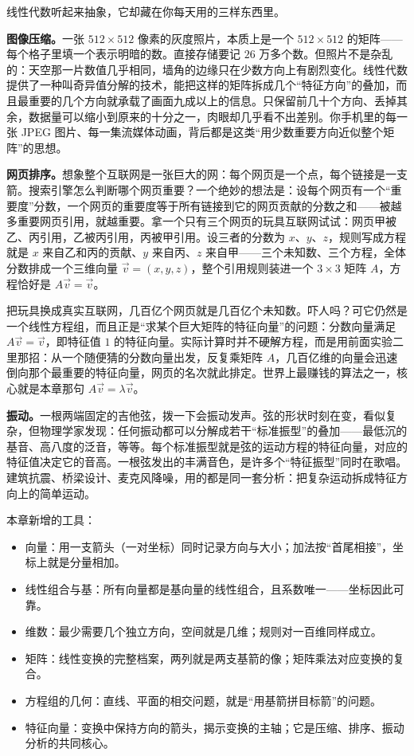 线性代数听起来抽象，它却藏在你每天用的三样东西里。

\textbf{图像压缩。}一张 $512\times512$ 像素的灰度照片，本质上是一个 $512\times512$ 的矩阵——每个格子里填一个表示明暗的数。直接存储要记 $26$ 万多个数。但照片不是杂乱的：天空那一片数值几乎相同，墙角的边缘只在少数方向上有剧烈变化。线性代数提供了一种叫奇异值分解的技术，能把这样的矩阵拆成几个“特征方向”的叠加，而且最重要的几个方向就承载了画面九成以上的信息。只保留前几十个方向、丢掉其余，数据量可以缩小到原来的十分之一，肉眼却几乎看不出差别。你手机里的每一张 JPEG 图片、每一集流媒体动画，背后都是这类“用少数重要方向近似整个矩阵”的思想。

\textbf{网页排序。}想象整个互联网是一张巨大的网：每个网页是一个点，每个链接是一支箭。搜索引擎怎么判断哪个网页重要？一个绝妙的想法是：设每个网页有一个“重要度”分数，一个网页的重要度等于所有链接到它的网页贡献的分数之和——被越多重要网页引用，就越重要。拿一个只有三个网页的玩具互联网试试：网页甲被乙、丙引用，乙被丙引用，丙被甲引用。设三者的分数为 $x$、$y$、$z$，规则写成方程就是 $x$ 来自乙和丙的贡献、$y$ 来自丙、$z$ 来自甲——三个未知数、三个方程，全体分数排成一个三维向量 $\vec{v}=(x,y,z)$，整个引用规则装进一个 $3\times3$ 矩阵 $A$，方程恰好是 $A\vec{v}=\vec{v}$。

把玩具换成真实互联网，几百亿个网页就是几百亿个未知数。吓人吗？可它仍然是一个线性方程组，而且正是“求某个巨大矩阵的特征向量”的问题：分数向量满足 $A\vec{v}=\vec{v}$，即特征值 $1$ 的特征向量。实际计算时并不硬解方程，而是用前面实验二里那招：从一个随便猜的分数向量出发，反复乘矩阵 $A$，几百亿维的向量会迅速倒向那个最重要的特征向量，网页的名次就此排定。世界上最赚钱的算法之一，核心就是本章那句 $A\vec{v}=\lambda\vec{v}$。

\textbf{振动。}一根两端固定的吉他弦，拨一下会振动发声。弦的形状时刻在变，看似复杂，但物理学家发现：任何振动都可以分解成若干“标准振型”的叠加——最低沉的基音、高八度的泛音，等等。每个标准振型就是弦的运动方程的特征向量，对应的特征值决定它的音高。一根弦发出的丰满音色，是许多个“特征振型”同时在歌唱。建筑抗震、桥梁设计、麦克风降噪，用的都是同一套分析：把复杂运动拆成特征方向上的简单运动。

\begin{toolbox}
本章新增的工具：
\begin{itemize}
\item 向量：用一支箭头（一对坐标）同时记录方向与大小；加法按“首尾相接”，坐标上就是分量相加。
\item 线性组合与基：所有向量都是基向量的线性组合，且系数唯一——坐标因此可靠。
\item 维数：最少需要几个独立方向，空间就是几维；规则对一百维同样成立。
\item 矩阵：线性变换的完整档案，两列就是两支基箭的像；矩阵乘法对应变换的复合。
\item 方程组的几何：直线、平面的相交问题，就是“用基箭拼目标箭”的问题。
\item 特征向量：变换中保持方向的箭头，揭示变换的主轴；它是压缩、排序、振动分析的共同核心。
\end{itemize}
\end{toolbox}

